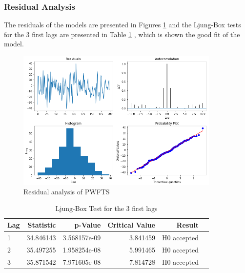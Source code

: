 \subsubsection{Residual Analysis}
\label{sec:pwfts_residual}

The residuals of the models are presented in Figures \ref{fig:pwfts_residual} and the Ljung-Box tests for the 3 first lags are presented in Table \ref{tab:pwfts_residual} , which is shown the good fit of the model. 

\begin{figure}[h]
    \centering
    \includegraphics[width=\textwidth,height=7cm]{figures/pwfts_residual.png}
    \caption{Residual analysis of PWFTS}
    \label{fig:pwfts_residual}
\end{figure}

\begin{table}[htb]
    \centering
\begin{tabular}{lrrrrl}
\toprule
Lag &  Statistic &       p-Value &  Critical Value &       Result \\
\midrule
1 &  34.846143 &  3.568157e-09 &        3.841459 &  H0 accepted \\
2 &  35.497255 &  1.958254e-08 &        5.991465 &  H0 accepted \\
3 &  35.871542 &  7.971605e-08 &        7.814728 &  H0 accepted \\
\bottomrule
\end{tabular}
    \caption{Ljung-Box Test for the 3 first lags}
    \label{tab:pwfts_residual}
\end{table}

